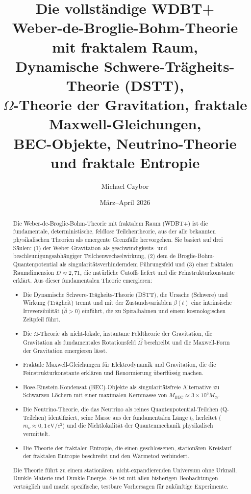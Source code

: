 \documentclass[12pt,a4paper]{article}
\title{Die vollständige WDBT+\\
\large{Weber-de-Broglie-Bohm-Theorie mit fraktalem Raum,\\
Dynamische Schwere-Trägheits-Theorie (DSTT),\\
$\Omega$-Theorie der Gravitation, fraktale Maxwell-Gleichungen,\\
BEC-Objekte, Neutrino-Theorie und fraktale Entropie}}
\author{Michael Czybor}
\date{März--April 2026}
\begin{document}
\maketitle

\begin{abstract}
Die Weber-de-Broglie-Bohm-Theorie mit fraktalem Raum (WDBT+) ist die fundamentale, deterministische, feldlose Teilchentheorie, aus der alle bekannten physikalischen Theorien als
emergente Grenzfälle hervorgehen. Sie basiert auf drei Säulen: (1) der Weber-Gravitation als geschwindigkeits- und beschleunigungsabhängiger Teilchenwechselwirkung, (2) dem
de Broglie-Bohm-Quantenpotential als singularitätsverhinderndem Führungsfeld und (3) einer fraktalen Raumdimension $D \approx 2,71$, die natürliche Cutoffs liefert und die
Feinstrukturkonstante erklärt. Aus dieser fundamentalen Theorie emergieren:

\begin{itemize}
\item Die Dynamische Schwere-Trägheits-Theorie (DSTT), die Ursache (Schwere) und Wirkung (Trägheit) trennt und mit der Zustandsvariablen $\beta(t)$ eine intrinsische Irreversibilität ($\dot{\beta} > 0$) einführt, die zu Spiralbahnen und einem kosmologischen Zeitpfeil führt.
\item Die $\Omega$-Theorie als nicht-lokale, instantane Feldtheorie der Gravitation, die Gravitation als fundamentales Rotationsfeld $\vec{\Omega}$ beschreibt und die Maxwell-Form der Gravitation emergieren lässt.
\item Fraktale Maxwell-Gleichungen für Elektrodynamik und Gravitation, die die Feinstrukturkonstante erklären und Renormierung überflüssig machen.
\item Bose-Einstein-Kondensat (BEC)-Objekte als singularitätsfreie Alternative zu Schwarzen Löchern mit einer maximalen Kernmasse von $M_{\text{BEC}} \approx 3 \times 10^6 M_{\odot}$.
\item Die Neutrino-Theorie, die das Neutrino als reines Quantenpotential-Teilchen (Q-Teilchen) identifiziert, seine Masse aus der fundamentalen Länge $l_0$ herleitet ($m_\nu \approx 0,1\,\text{eV}/c^2$) und die Nichtlokalität der Quantenmechanik physikalisch vermittelt.
\item Die Theorie der fraktalen Entropie, die einen geschlossenen, stationären Kreislauf der fraktalen Entropie beschreibt und den Wärmetod verhindert.
\end{itemize}

Die Theorie führt zu einem stationären, nicht-expandierenden Universum ohne Urknall, Dunkle Materie und Dunkle Energie. Sie ist mit allen bisherigen Beobachtungen verträglich und macht spezifische, testbare Vorhersagen für zukünftige Experimente.
\end{abstract}
\end{document}
